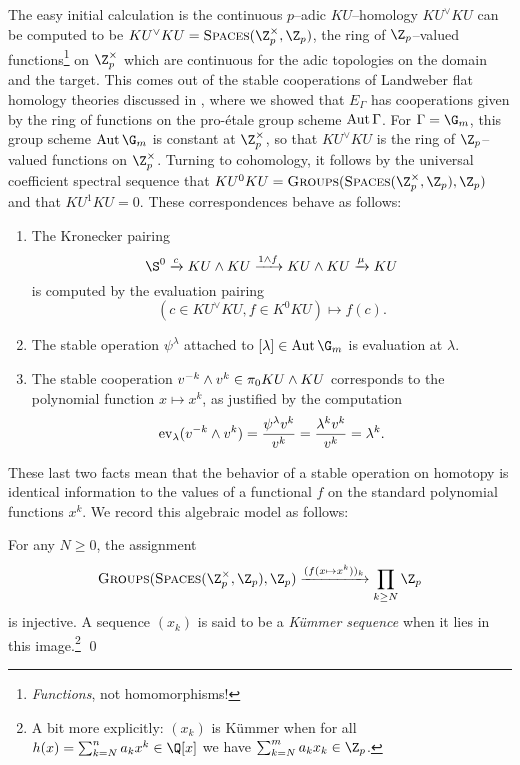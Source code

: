 The easy initial calculation is the continuous \(p\)--adic \(KU\)--homology \(KU^\vee KU\) can be computed to be \(KU^\vee KU = \CatOf{Spaces}(\Z_p^\times, \Z_p)\), the ring of \(\Z_p\)--valued functions\footnote{\emph{Functions}, not homomorphisms!} on \(\Z_p^\times\) which are continuous for the adic topologies on the domain and the target.  This comes out of the stable cooperations of Landweber flat homology theories discussed in , where we showed that \(E_\Gamma\) has cooperations given by the ring of functions on the pro-\'etale group scheme \(\operatorname{Aut} \Gamma\).  For \(\Gamma = \G_m\), this group scheme \(\Aut \G_m\) is constant at \(\Z_p^\times\), so that \(KU^\vee KU\) is the ring of \(\Z_p\)--valued functions on \(\Z_p^\times\).  Turning to cohomology, it follows by the universal coefficient spectral sequence that \(KU^0 KU = \CatOf{Groups}(\CatOf{Spaces}(\Z_p^\times, \Z_p), \Z_p)\) and that \(KU^1 KU = 0\).  These correspondences behave as follows:
\begin{enumerate}
    \item The Kronecker pairing \[\S^0 \xrightarrow{c} KU \sm KU \xrightarrow{1 \sm f} KU \sm KU \xrightarrow{\mu} KU\] is computed by the evaluation pairing \[(c \in KU^\vee KU, f \in K^0 KU) \mapsto f(c).\]
    \item The stable operation \(\psi^\lambda\) attached to \([\lambda] \in \Aut \G_m\) is evaluation at \(\lambda\).
    \item The stable cooperation \(v^{-k} \wedge v^k \in \pi_0 KU \wedge KU\) corresponds to the polynomial function \(x \mapsto x^k\), as justified by the computation \[\operatorname{ev}_{\lambda}(v^{-k} \wedge v^k) = \frac{\psi^\lambda v^k}{v^k} = \frac{\lambda^k v^k}{v^k} = \lambda^k.\]
\end{enumerate}

\noindent These last two facts mean that the behavior of a stable operation on homotopy is identical information to the values of a functional \(f\) on the standard polynomial functions \(x^k\).  We record this algebraic model as follows:
\begin{lemma}
For any \(N \ge 0\), the assignment \[\CatOf{Groups}(\CatOf{Spaces}(\Z_p^\times, \Z_p), \Z_p) \xrightarrow{(f(x \mapsto x^k))_k} \prod_{k \ge N} \Z_p\] is injective.  A sequence \((x_k)\) is said to be a \textit{K\"ummer sequence} when it lies in this image.\footnote{A bit more explicitly: \((x_k)\) is K\"ummer when for all \(h(x) = \sum_{k=N}^n a_k x^k \in \Q[x]\) we have \(\sum_{k=N}^m a_k x_k \in \Z_p\).} \qed
\end{lemma}

